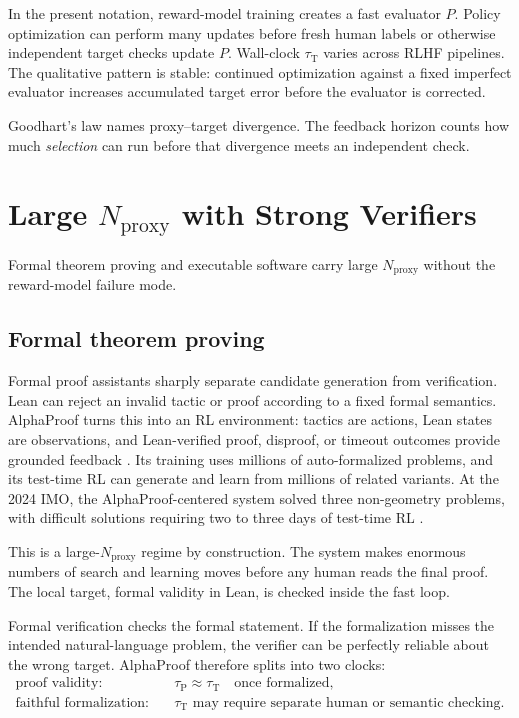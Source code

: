 \documentclass[11pt]{article}
\newcommand{\tauP}{\tau_{\mathrm{P}}}
\newcommand{\tauT}{\tau_{\mathrm{T}}}
\newcommand{\Nproxy}{N_{\mathrm{proxy}}}
\begin{document}
In the present notation, reward-model training creates a fast evaluator \(P\). Policy optimization can perform many updates before fresh human labels or otherwise independent target checks update \(P\). Wall-clock \(\tauT\) varies across RLHF pipelines. The qualitative pattern is stable: continued optimization against a fixed imperfect evaluator increases accumulated target error before the evaluator is corrected.

Goodhart's law names proxy--target divergence. The feedback horizon counts how much \emph{selection} can run before that divergence meets an independent check.

\section{Large \(\Nproxy\) with Strong Verifiers}

Formal theorem proving and executable software carry large \(\Nproxy\) without the reward-model failure mode.

\subsection{Formal theorem proving}

Formal proof assistants sharply separate candidate generation from verification. Lean can reject an invalid tactic or proof according to a fixed formal semantics. AlphaProof turns this into an RL environment: tactics are actions, Lean states are observations, and Lean-verified proof, disproof, or timeout outcomes provide grounded feedback \parencite{hubert2025alphaproof}. Its training uses millions of auto-formalized problems, and its test-time RL can generate and learn from millions of related variants. At the 2024 IMO, the AlphaProof-centered system solved three non-geometry problems, with difficult solutions requiring two to three days of test-time RL \parencite{hubert2025alphaproof}.

This is a large-\(\Nproxy\) regime by construction. The system makes enormous numbers of search and learning moves before any human reads the final proof. The local target, formal validity in Lean, is checked inside the fast loop.

Formal verification checks the formal statement. If the formalization misses the intended natural-language problem, the verifier can be perfectly reliable about the wrong target. AlphaProof therefore splits into two clocks:
\begin{align*}
\text{proof validity:}&\quad \tauP \approx \tauT \quad \text{once formalized},\\
\text{faithful formalization:}&\quad \tauT \text{ may require separate human or semantic checking}.
\end{align*}
\end{document}
